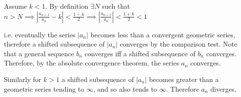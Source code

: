 \documentclass{article}
\begin{document}
Assume $k < 1$. By definition $\exists N$ such that \newline $n > N \implies |\frac{a_{n+1}}{a_n} - k| < \frac{1-k}{2} \implies |\frac{a_{n+1}}{a_n}| < \frac{1+k}{2} < 1$


i.e. eventually the series $|a_n|$ becomes less than a convergent geometric series, therefore a shifted subsequence of $|a_n|$ converges by the comparison test. Note that a general sequence $b_n$ converges iff a shifted subsequence of $b_n$ converges. Therefore, by the absolute convergence theorem, the series $a_n$ converges.

Similarly for $k > 1$ a shifted subsequence of $|a_n|$ becomes greater than a geometric series tending to $\infty$, and so also tends to $\infty$. Therefore $a_n$ diverges.
\end{document}
